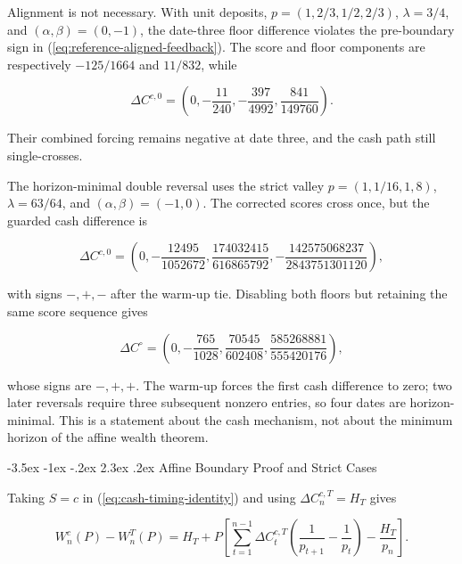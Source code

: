 \documentclass[12pt,a4paper,oneside]{report}
\makeatletter
\renewcommand\section{\@startsection{section}{1}{\z@}%
  {-3.5ex \@plus -1ex \@minus -.2ex}%
  {2.3ex \@plus .2ex}%
  {\normalfont\fontsize{14}{17}\selectfont\bfseries}}
\makeatother
\begin{document}
Alignment is not necessary. With unit deposits,
$p=(1,2/3,1/2,2/3)$, $\lambda=3/4$, and
$(\alpha,\beta)=(0,-1)$, the date-three floor difference violates the
pre-boundary sign in (\ref{eq:reference-aligned-feedback}). The score and floor
components are respectively $-125/1664$ and $11/832$, while

\begin{equation}
  \Delta C^{c,0}
  =\left(0,-\frac{11}{240},-\frac{397}{4992},
                 \frac{841}{149760}\right).
  \label{eq:appendix-alignment-not-necessary}
\end{equation}

Their combined forcing remains negative at date three, and the cash path still
single-crosses.

The horizon-minimal double reversal uses the strict valley
$p=(1,1/16,1,8)$, $\lambda=63/64$, and
$(\alpha,\beta)=(-1,0)$. The corrected scores cross once, but the guarded cash
difference is

\begin{equation}
  \Delta C^{c,0}=\left(
  0,-\frac{12495}{1052672},
  \frac{174032415}{616865792},
  -\frac{142575068237}{2843751301120}
  \right),
  \label{eq:appendix-double-reversal}
\end{equation}

with signs $-,+,-$ after the warm-up tie. Disabling both floors but retaining
the same score sequence gives

\begin{equation}
  \Delta C^{\circ}=\left(
  0,-\frac{765}{1028},
  \frac{70545}{602408},
  \frac{585268881}{555420176}
  \right),
  \label{eq:appendix-no-floor-crossing}
\end{equation}

whose signs are $-,+,+$. The warm-up forces the first cash difference to zero;
two later reversals require three subsequent nonzero entries, so four dates are
horizon-minimal. This is a statement about the cash mechanism, not about the
minimum horizon of the affine wealth theorem.

\section{Affine Boundary Proof and Strict Cases}
\label{sec:appendix-affine-boundary}

Taking $S=c$ in (\ref{eq:cash-timing-identity}) and using
$\Delta C_n^{c,T}=H_T$ gives

\begin{equation}
  W_n^c(P)-W_n^T(P)=H_T+P
  \left[
  \sum_{t=1}^{n-1}\Delta C_t^{c,T}
       \left(\frac1{p_{t+1}}-\frac1{p_t}\right)
  -\frac{H_T}{p_n}
  \right].
  \label{eq:appendix-affine-cash-route}
\end{equation}
\end{document}
